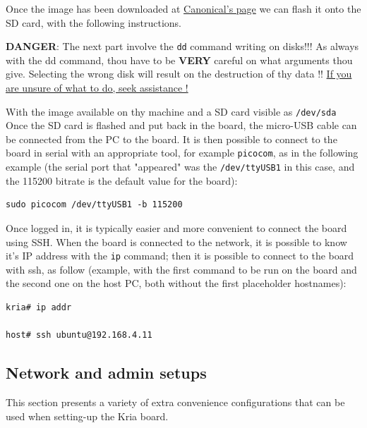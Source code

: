 \documentclass[10pt]{article}
\begin{document}
Once the image has been downloaded at \href{https://ubuntu.com/download/amd-xilinx}{Canonical's page}
we can flash it onto the SD card, with the following instructions.

\begin{tcolorbox}[colback=red!5!white,colframe=red!75!black]
\textbf{DANGER}: The next part involve the \texttt{dd} command writing on disks!!!
As always with the dd command, thou have to be \textbf{VERY} careful on what arguments
thou give. Selecting the wrong disk will result on the destruction of
thy data !!
\uline{If you are unsure of what to do, seek assistance !}
\end{tcolorbox}

With the image available on thy machine and a SD card visible as \texttt{/dev/sda}
Once the SD card is flashed and put back in the board, the micro-USB cable can be
connected from the PC to the board. It is then possible to
connect to the board in serial with an appropriate tool, for example \texttt{picocom},
as in the following example (the serial port that "appeared" was the \texttt{/dev/ttyUSB1} in this case,
and the 115200 bitrate is the default value for the board):

\begin{verbatim}
sudo picocom /dev/ttyUSB1 -b 115200
\end{verbatim}

Once logged in, it is typically easier and more convenient to connect the board
using SSH. When the board is connected to the network, it is possible to know
it's IP address with the \texttt{ip} command; then it is possible to connect to
the board with ssh, as follow (example, with the first command to be run on the board
and the second one on the host PC, both without the first placeholder hostnames):


\begin{verbatim}
kria# ip addr

host# ssh ubuntu@192.168.4.11
\end{verbatim}

\subsection{Network and admin setups}
\label{sec:org104ec75}
This section presents a variety of extra convenience configurations
that can be used when setting-up the Kria board.
\end{document}
